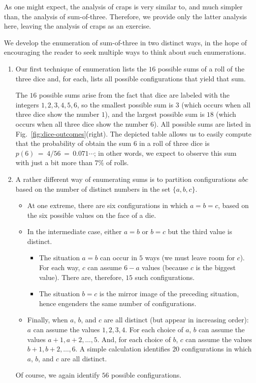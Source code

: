 \bigskip

As one might expect, the analysis of craps is very similar to, and
much simpler than, the analysis of sum-of-three.  Therefore, we provide
only the latter analysis here, leaving the analysis of craps as an exercise.

We develop the enumeration of sum-of-three in two distinct ways, in the hope of 
encouraging the reader to seek multiple ways to think about such enumerations.
\begin{enumerate}
\item 
Our first technique of enumeration lists the $16$ possible sums of a roll of the three 
dice and, for each, lists all possible configurations that yield that sum.

The $16$ possible sums arise from the fact that dice are
labeled with the integers $1, 2, 3, 4, 5, 6$, so the smallest possible
sum is $3$ (which occurs when all three dice show the number $1$), and
the largest possible sum is $18$ (which occurs when all three dice
show the number $6$).  All possible sums are listed in
Fig.~\ref{fig:dice-outcomes}(right).  The depicted table allows
us to easily compute that the probability of obtain the sum $6$ in a
roll of three dice is $p(6) \ = \ 4/56 \ = \ 0.071\cdots$; in other
words, we expect to observe this sum with just a bit more than $7\%$ of rolls.

\item 
A rather different way of enumerating sums is to partition
configurations $abc$ based on the number of distinct numbers in the
set $\{ a, b, c\}$.
\begin{itemize}
\item
At one extreme, there are six configurations in which $a = b = c$,
based on the six possible values on the face of a die.
\item
In the intermediate case, either $a=b$ or $b=c$ but the third value is
distinct.
  \begin{itemize}
  \item
The situation $a=b$ can occur in $5$ ways (we must leave room for
$c$).  For each way, $c$ can assume $6-a$ values (because $c$ is the
biggest value).  There are, therefore, $15$ such configurations.
  \item
The situation $b=c$ is the mirror image of the preceding situation,
hence engenders the same number of configurations.
  \end{itemize}

\item
Finally, when $a$, $b$, and $c$ are all distinct (but appear in
increasing order): $a$ can assume the values $1, 2, 3, 4$.  For each
choice of $a$, $b$ can assume the values $a+1, a+2, \ldots, 5$.  And,
for each choice of $b$, $c$ can assume the values $b+1, b+2, \ldots,
6$.  A simple calculation identifies $20$ configurations in which $a$,
$b$, and $c$ are all distinct.
\end{itemize}
Of course, we again identify $56$ possible configurations.
\end{enumerate}

